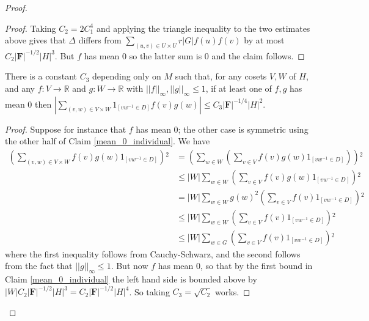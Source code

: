 \documentclass[10pt,a4paper]{amsart}
\begin{document}
\begin{proof}
\begin{proof}
    Taking $C_2=2C_1^4$ and applying the triangle inequality to the two estimates above gives that $\Delta$ differs from $\sum_{(u,v)\in U\times U}r|G|f(u)f(v)$ by at most $C_2|\mathbf{F}|^{-1/2}|H|^3$. But $f$ has mean $0$ so the latter sum is $0$ and the claim follows.
\end{proof}

\begin{claim}\label{mean_0_both}
    There is a constant $C_3$ depending only on $M$ such that, for any cosets $V,W$ of $H$, and any $f:V\to\mathbb{R}$ and $g:W\to\mathbb{R}$ with $||f||_\infty,||g||_\infty\leqslant 1$, if at least one of $f,g$ has mean $0$ then $|\sum_{(v,w)\in V\times W}1_{[vw^{-1}\in D]}f(v)g(w)|\leqslant C_3|\mathbf{F}|^{-1/4}|H|^2$.
\end{claim}

\begin{proof}
    Suppose for instance that $f$ has mean $0$; the other case is symmetric using the other half of Claim \ref{mean_0_individual}. We have
    \begin{align*}
    \left(\sum_{(v,w)\in V\times W}f(v)g(w)1_{[vw^{-1}\in D]}\right){}^2&=\left(\sum_{w\in W}\left(\sum_{v\in V}f(v)g(w)1_{[vw^{-1}\in D]}\right)\right){}^2\\
    &\leqslant |W|\sum_{w\in W}\left(\sum_{v\in V}f(v)g(w)1_{[vw^{-1}\in D]}\right){}^2 \\
    &=|W|\sum_{w\in W}g(w)^2\left(\sum_{v\in V}f(v)1_{[vw^{-1}\in D]}\right){}^2 \\
    &\leqslant |W|\sum_{w\in W}\left(\sum_{v\in V}f(v)1_{[vw^{-1}\in D]}\right){}^2 \\
    &\leqslant |W|\sum_{w\in G}\left(\sum_{v\in V}f(v)1_{[vw^{-1}\in D]}\right){}^2
\end{align*} where the first inequality follows from Cauchy-Schwarz, and the second follows from the fact that $||g||_\infty\leqslant 1$. But now $f$ has mean $0$, so that by the first bound in Claim \ref{mean_0_individual} the left hand side is bounded above by $|W|C_2|\mathbf{F}|^{-1/2}|H|^3= C_2|\mathbf{F}|^{-1/2}|H|^4$. So taking $C_3=\sqrt{C_2}$ works.
\end{proof}


\end{proof}
\end{document}
